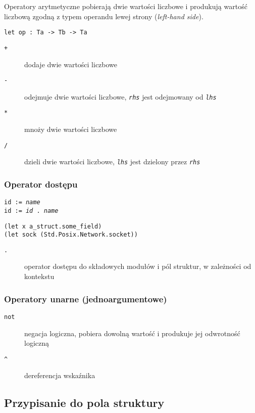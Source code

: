 \documentclass[11pt,oneside,a4paper,titlepage,onecolumn]{article}
\begin{document}
Operatory arytmetyczne pobierają dwie wartości liczbowe i produkują wartość liczbową zgodną z typem operandu
lewej strony (\emph{left-hand side}).

\begin{lstlisting}
let op : Ta -> Tb -> Ta
\end{lstlisting}

\begin{description}
    \item[\texttt{+}] dodaje dwie wartości liczbowe
    \item[\texttt{-}] odejmuje dwie wartości liczbowe, \emph{\texttt{rhs}} jest odejmowany od
        \emph{\texttt{lhs}}
    \item[\texttt{*}] mnoży dwie wartości liczbowe
    \item[\texttt{/}] dzieli dwie wartości liczbowe, \emph{\texttt{lhs}} jest dzielony przez
        \emph{\texttt{rhs}}
\end{description}

\subsubsection{Operator dostępu}

\texttt{id := \emph{name}} \\
\texttt{id := \emph{id} . \emph{name}}

\begin{lstlisting}
(let x a_struct.some_field)
(let sock (Std.Posix.Network.socket))
\end{lstlisting}

\begin{description}
    \item[\texttt{.}] operator dostępu do składowych modułów i pól struktur, w zależności od kontekstu
\end{description}

\subsubsection{Operatory unarne (jednoargumentowe)}

\begin{description}
    \item[\texttt{not}] negacja logiczna, pobiera dowolną wartość i produkuje jej odwrotność logiczną
    \item[\texttt{\^}] dereferencja wskaźnika
\end{description}

\subsection{Przypisanie do pola struktury}
\end{document}

